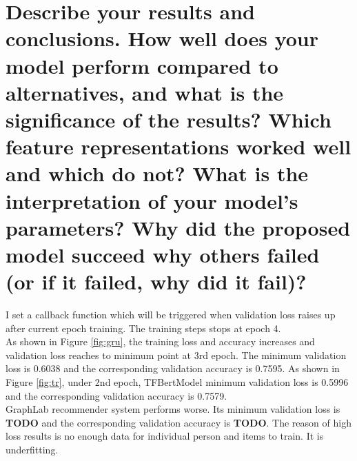 \documentclass[12pt]{article}
\begin{document}
\section{Describe your results and conclusions. How well does your model perform compared to
alternatives, and what is the significance of the results? Which feature representations worked
well and which do not? What is the interpretation of your model’s parameters? Why did the
proposed model succeed why others failed (or if it failed, why did it fail)?}
I set a callback function which will be triggered when validation loss raises up after current epoch training.
The training steps stops at epoch 4.\\
As shown in Figure \ref{fig:gru}, the training loss and accuracy increases and validation loss reaches to minimum point at 3rd epoch. The minimum validation loss is 0.6038 and the corresponding validation accuracy is 0.7595.
As shown in Figure \ref{fig:tr}, under 2nd epoch, TFBertModel minimum validation loss is 0.5996 and the corresponding validation accuracy is 0.7579.\\
GraphLab recommender system performs worse. Its minimum validation loss is \textbf{TODO} and the corresponding validation accuracy is \textbf{TODO}. The reason of high loss results is no enough data for individual person
and items to train. It is underfitting.\\
\end{document}
